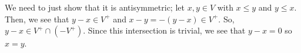 %
%
\label {sol: underlying preorder of an ordered vector space is a partial order}We need to just show that it is antisymmetric; let $x,y \in V$ with $x \leq y$ and $y \leq x$. Then, we see that $y-x \in V^+$ and $x-y = -(y-x) \in V^+$. So, $y-x \in V^+ \cap (-V^+)$. Since this intersection is trivial, we see that $y-x = 0$ so $x = y$.

